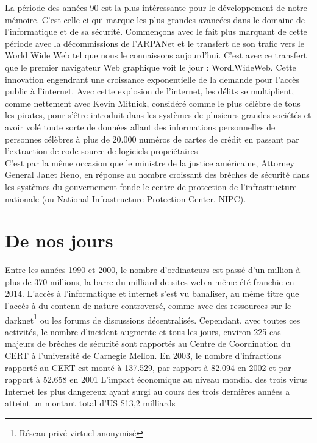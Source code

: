 \documentclass[a4paper]{memoir}
\begin{document}
La période des années 90 est la plus intéressante pour le développement de notre mémoire. C'est celle-ci qui marque les plus grandes avancées dans le domaine de l'informatique et de sa sécurité.
Commençons avec le fait plus marquant de cette période avec la décommissions de l'ARPANet et le transfert de son trafic vers le World Wide Web tel que nous le connaissons aujourd'hui. C'est avec ce transfert que le premier navigateur Web graphique voit le jour : WordlWideWeb. Cette innovation engendrant une croissance exponentielle de la demande pour l'accès public à l'internet. Avec cette explosion de l'internet, les délits se multiplient, comme nettement avec Kevin Mitnick, considéré comme le plus célèbre de tous les pirates, pour s'être introduit dans les systèmes de plusieurs grandes sociétés et avoir volé toute sorte de données allant des informations personnelles de personnes célèbres à plus de 20.000 numéros de cartes de crédit en passant par l'extraction de code source de logiciels propriétaires \\
\noindent C'est par la même occasion que le ministre de la justice américaine, Attorney General Janet Reno, en réponse au nombre croissant des brèches de sécurité dans les systèmes du gouvernement fonde le centre de protection de l'infrastructure nationale (ou National Infrastructure Protection Center, NIPC).


\section{De nos jours}

Entre les années 1990 et 2000, le nombre d'ordinateurs est passé d'un million à plus de 370 millions, la barre du milliard de sites web a même été franchie en 2014. L'accès à l'informatique et internet s'est vu banaliser, au même titre que l'accès à du contenu de nature controversé, comme avec des ressources sur le darknet\footnote{Réseau privé virtuel anonymisé} ou les forums de discussions décentralisés.
Cependant, avec toutes ces activités, le nombre d'incident augmente et tous les jours, environ 225 cas majeurs de brèches de sécurité sont rapportés au Centre de Coordination du CERT à l'université de Carnegie Mellon.
En 2003, le nombre d'infractions rapporté au CERT est monté à 137.529, par rapport à 82.094 en 2002 et par rapport à 52.658 en 2001
L'impact économique au niveau mondial des trois virus Internet les plus dangereux ayant surgi au cours des trois dernières années a atteint un montant total d’US \$13,2 milliards\\
\end{document}
